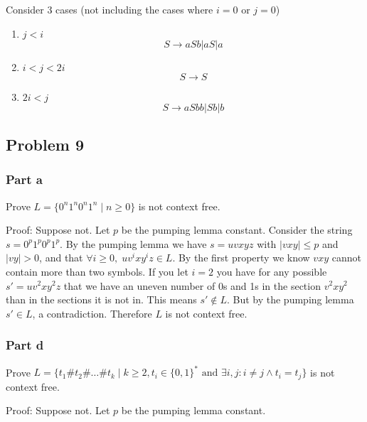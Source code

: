\documentclass[english]{article}
\begin{document}
Consider 3 cases (not including the cases where $i=0$ or $j=0$)
\begin{enumerate}
\item \(j < i\)
\[ S \rightarrow aSb | aS | a \]

\item \(i < j < 2i\)
\[ S \rightarrow  S \] %

\item \(2i < j\)
\[ S \rightarrow aSbb | Sb | b \]

\end{enumerate}

\subsection*{Problem 9}
\subsubsection*{Part a}
Prove \(L = \{0^n 1^n 0^n 1^n \mid n \ge 0\}\) is not context free.

Proof: Suppose not. Let $p$ be the pumping lemma constant. Consider the string $s = 0^p 1^p 0^p 1^p$. By the pumping lemma
we have $s = uvxyz$ with $|vxy| \le p$ and $|vy| > 0$, and that \(\forall i \ge 0,\; uv^ixy^iz \in L\). By the first property
we know $vxy$ cannot contain more than two symbols. If you let $i=2$ you have for any possible $s' = uv^2xy^2z$ that we have
an uneven number of 0s and 1s in the section $v^2xy^2$ than in the sections it is not in. This means $s' \notin L$.
But by the pumping lemma $s' \in L$, a contradiction. Therefore $L$ is not context free.

\subsubsection*{Part d}
Prove \(L = \{t_1\#t_2\#\ldots\#t_k \mid k \ge 2, t_i \in \{0,1\}^* \textrm{ and } \exists i, j : i \neq j \land t_i = t_j \}\) is not context free.

Proof: Suppose not. Let $p$ be the pumping lemma constant. %
\end{document}
